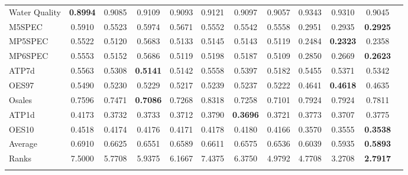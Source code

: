 \documentclass{article}
\begin{document}
\begin{table}[b!]
{\begin{tabular}{l@{\extracolsep{\fill}}ccccccccccc}
Water Quality &\textbf{0.8994} &0.9085 &0.9109 &0.9093 &0.9121 &0.9097 &0.9057 &0.9343 &0.9310 &0.9045   \\
M5SPEC &0.5910 &0.5523 &0.5974 &0.5671 &0.5552 &0.5542 &0.5558 &0.2951 &0.2935 &\textbf{0.2925}   \\
MP5SPEC &0.5522 &0.5120 &0.5683 &0.5133 &0.5145 &0.5143 &0.5119 &0.2484 &\textbf{0.2323} &0.2358   \\
MP6SPEC &0.5553 &0.5152 &0.5686 &0.5119 &0.5198 &0.5187 &0.5109 &0.2850 &0.2669 &\textbf{0.2623}   \\
ATP7d &0.5563 &0.5308 &\textbf{0.5141} &0.5142 &0.5558 &0.5397 &0.5182 &0.5455 &0.5371 &0.5342   \\
OES97 &0.5490 &0.5230 &0.5229 &0.5217 &0.5239 &0.5237 &0.5222 &0.4641 &\textbf{0.4618} &0.4635   \\
Osales &0.7596 &0.7471 &\textbf{0.7086} &0.7268 &0.8318 &0.7258 &0.7101 &0.7924 &0.7924 &0.7811   \\
ATP1d &0.4173 &0.3732 &0.3733 &0.3712 &0.3790 &\textbf{0.3696} &0.3721 &0.3773 &0.3707 &0.3775   \\
OES10 &0.4518 &0.4174 &0.4176 &0.4171 &0.4178 &0.4180 &0.4166 &0.3570 &0.3555 &\textbf{0.3538}   \\
\noalign{\smallskip}\hline\noalign{\smallskip}
Average &0.6910 &0.6625 &0.6551 &0.6589 &0.6611 &0.6575 &0.6536 &0.6039 &0.5935 &\textbf{0.5893}   \\
Ranks &7.5000 &5.7708 &5.9375 &6.1667 &7.4375 &6.3750 &4.9792 &4.7708 &3.2708 &\textbf{2.7917}   \\
\noalign{\smallskip}\hline
\end{tabular}}
\end{table}
\end{document}
